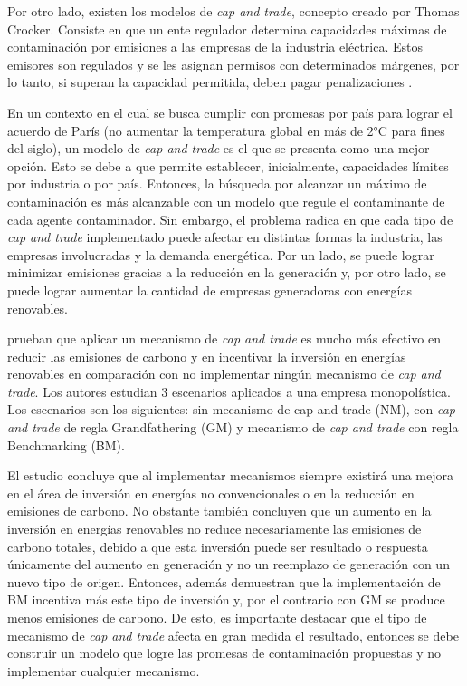 Por otro lado, existen los modelos de \textit{cap and trade}, concepto creado por Thomas Crocker. Consiste en que un ente regulador determina capacidades máximas de contaminación por emisiones a las empresas de la industria eléctrica. Estos emisores son regulados y se les asignan permisos con determinados márgenes, por lo tanto, si superan la capacidad permitida, deben pagar penalizaciones . 
\vspace{2.5mm}

En un contexto en el cual se busca cumplir con promesas por país para lograr el acuerdo de París (no aumentar la temperatura global en más de 2°C para fines del siglo), un modelo de \textit{cap and trade} es el que se presenta como una mejor opción. Esto se debe a que permite establecer, inicialmente, capacidades límites por industria o por país. Entonces, la búsqueda por alcanzar un máximo de contaminación es más alcanzable con un modelo que regule el contaminante de cada agente contaminador. Sin embargo, el problema radica en que cada tipo de \textit{cap and trade} implementado puede afectar en distintas formas la industria, las empresas involucradas y la demanda energética. Por un lado, se puede lograr minimizar emisiones gracias a la reducción en la generación y, por otro lado, se puede lograr aumentar la cantidad de empresas generadoras con energías renovables.
\vspace{2.5mm}

 prueban que aplicar un mecanismo de \textit{cap and trade} es mucho más efectivo en reducir las emisiones de carbono y en incentivar la inversión en energías renovables en comparación con no implementar ningún mecanismo de \textit{cap and trade}. Los autores estudian 3 escenarios aplicados a una empresa monopolística. Los escenarios son los siguientes: sin mecanismo de cap-and-trade (NM), con \textit{cap and trade} de regla Grandfathering (GM) y mecanismo de \textit{cap and trade} con regla Benchmarking (BM). 
\vspace{2.5mm}

El estudio concluye que al implementar mecanismos siempre existirá una mejora en el área de inversión en energías no convencionales o en la reducción en emisiones de carbono. No obstante también concluyen que un aumento en la inversión en energías renovables no reduce necesariamente las emisiones de carbono totales, debido a que esta inversión puede ser resultado o respuesta únicamente del aumento en generación y no un reemplazo de generación con un nuevo tipo de origen. Entonces, además demuestran que la implementación de BM incentiva más este tipo de inversión y, por el contrario con GM se produce menos emisiones de carbono. De esto, es importante destacar que el tipo de mecanismo de \textit{cap and trade} afecta en gran medida el resultado, entonces se debe construir un modelo que logre las promesas de contaminación propuestas y no implementar cualquier mecanismo. 
\vspace{2.5mm}

